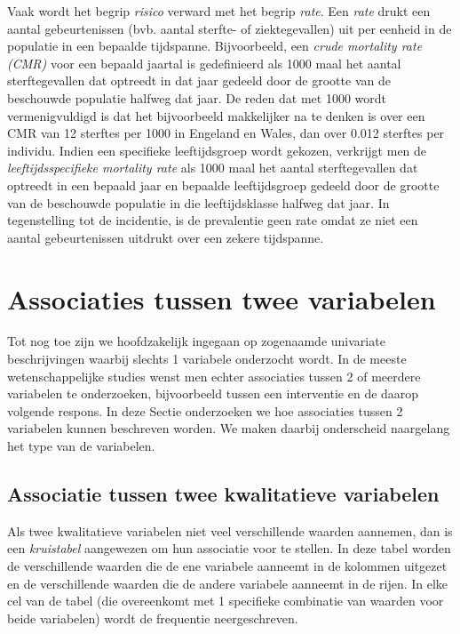 \documentclass[
  12pt,dutch,coursenotes]{book}
\theoremstyle{definition}
\theoremstyle{definition}
\theoremstyle{definition}
\theoremstyle{remark}
\begin{document}
Vaak wordt het begrip \emph{risico} verward met het begrip \emph{rate}. Een
\emph{rate} drukt een aantal gebeurtenissen (bvb. aantal sterfte- of
ziektegevallen) uit per eenheid in de populatie in een bepaalde tijdspanne.
Bijvoorbeeld, een \emph{crude mortality rate (CMR)} voor een bepaald
jaartal is gedefinieerd als 1000 maal het aantal sterftegevallen dat
optreedt in dat jaar gedeeld door de grootte van de beschouwde populatie
halfweg dat jaar. De reden dat met 1000 wordt vermenigvuldigd is dat het
bijvoorbeeld makkelijker na te denken is over een CMR van 12 sterftes per
1000 in Engeland en Wales, dan over 0.012 sterftes per individu. Indien een
specifieke leeftijdsgroep wordt gekozen, verkrijgt men de \emph{leeftijdsspecifieke mortality rate} als 1000 maal het aantal sterftegevallen
dat optreedt in een bepaald jaar en bepaalde leeftijdsgroep gedeeld door de
grootte van de beschouwde populatie in die leeftijdsklasse halfweg dat jaar.
In tegenstelling tot de incidentie, is de prevalentie geen rate omdat ze
niet een aantal gebeurtenissen uitdrukt over een zekere tijdspanne.

\hypertarget{associaties-tussen-twee-variabelen}{%
\section{Associaties tussen twee variabelen}\label{associaties-tussen-twee-variabelen}}

Tot nog toe zijn we hoofdzakelijk ingegaan op zogenaamde univariate beschrijvingen waarbij slechts 1 variabele onderzocht wordt. In de meeste wetenschappelijke studies wenst men echter associaties tussen 2 of meerdere variabelen te onderzoeken, bijvoorbeeld tussen een interventie en de daarop volgende respons. In deze Sectie onderzoeken we hoe associaties tussen 2 variabelen kunnen beschreven worden. We maken daarbij onderscheid naargelang het type van de variabelen.

\hypertarget{subsec:kruistabel}{%
\subsection{Associatie tussen twee kwalitatieve variabelen}\label{subsec:kruistabel}}

Als twee kwalitatieve variabelen niet veel verschillende waarden aannemen,
dan is een \emph{kruistabel} aangewezen om hun associatie voor te stellen.
In deze tabel worden de verschillende waarden die de ene variabele aanneemt
in de kolommen uitgezet en de verschillende waarden die de andere variabele
aanneemt in de rijen. In elke cel van de tabel (die overeenkomt met 1
specifieke combinatie van waarden voor beide variabelen) wordt de frequentie
neergeschreven.
\end{document}

